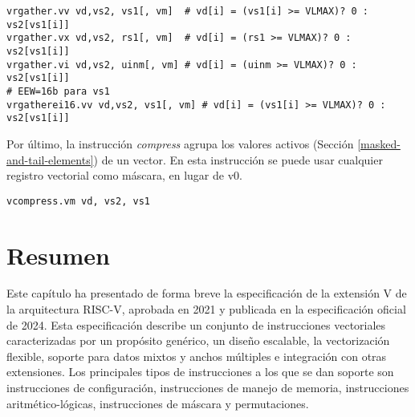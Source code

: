 \begin{lstlisting}
vrgather.vv vd,vs2, vs1[, vm]  # vd[i] = (vs1[i] >= VLMAX)? 0 : vs2[vs1[i]]
vrgather.vx vd,vs2, rs1[, vm]  # vd[i] = (rs1 >= VLMAX)? 0 : vs2[vs1[i]]
vrgather.vi vd,vs2, uinm[, vm] # vd[i] = (uinm >= VLMAX)? 0 : vs2[vs1[i]]
# EEW=16b para vs1
vrgatherei16.vv vd,vs2, vs1[, vm] # vd[i] = (vs1[i] >= VLMAX)? 0 : vs2[vs1[i]]
\end{lstlisting}

Por último, la instrucción \textit{compress} agrupa los valores activos
(Sección \ref{masked-and-tail-elements}) de un vector. En esta instrucción se puede
usar cualquier registro vectorial como máscara, en lugar de v0.

\begin{lstlisting}
vcompress.vm vd, vs2, vs1
\end{lstlisting}

\section{Resumen}
Este capítulo ha presentado de forma breve la especificación de la extensión V de la arquitectura RISC-V, aprobada en 2021 y publicada en la especificación oficial de 2024. Esta especificación describe un conjunto de instrucciones vectoriales caracterizadas por un propósito genérico, un diseño escalable, la vectorización flexible, soporte para datos mixtos y anchos múltiples e integración con otras extensiones. Los principales tipos de instrucciones a los que se dan soporte son instrucciones de configuración, instrucciones de manejo de memoria, instrucciones aritmético-lógicas, instrucciones de máscara y permutaciones.  

